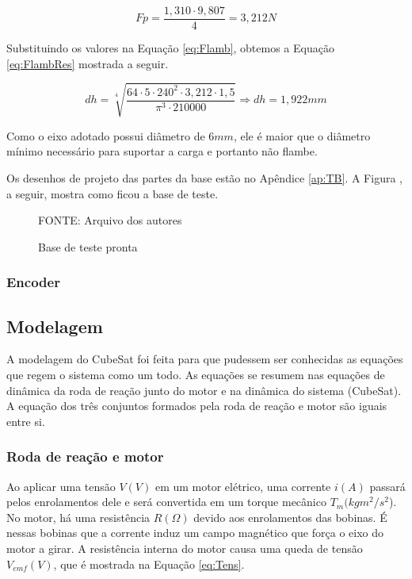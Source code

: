\documentclass[
	12pt,				%
	openany,			%
	twoside,			%
	a4paper,			%
	english,			%
	french,				%
	spanish,			%
	brazil,				%
	oldfontcommands
	]{abntex2}
\begin{document}
\begin{equation}
Fp = \frac{1,310 \cdot 9,807}{4} = 3,212 N
\label{eq:Fp}
\end{equation}

Substituindo os valores na Equação \ref{eq:Flamb}, obtemos a Equação \ref{eq:FlambRes} mostrada a seguir.

\begin{equation}
dh = \sqrt[4]{ \frac{64 \cdot 5 \cdot 240^{2} \cdot 3,212 \cdot 1,5 }{ \pi^{3} \cdot 210000 } } \Longrightarrow dh = 1,922 mm
\label{eq:FlambRes}
\end{equation}

Como o eixo adotado possui diâmetro de $6mm$, ele é maior que o diâmetro mínimo necessário para suportar a carga e portanto não flambe.

Os desenhos de projeto das partes da base estão no Apêndice \ref{ap:TB}. A Figura , a seguir, mostra como ficou a base de teste.

\begin{figure}[th]
	\caption{Base de teste pronta}
	\centering
	
	\begin{small}
		FONTE: Arquivo dos autores
	\end{small}
	\label{fig:ProtoTB}
\end{figure}

\subsubsection{Encoder}



\subsection{Modelagem}

A modelagem do CubeSat foi feita para que pudessem ser conhecidas as equações que regem o sistema como um todo. As equações se resumem nas equações de dinâmica da roda de reação junto do motor e na dinâmica do sistema (CubeSat). A equação dos três conjuntos formados pela roda de reação e motor são iguais entre si.

\subsubsection{Roda de reação e motor}

Ao aplicar uma tensão $V(V)$ em um motor elétrico, uma corrente $i(A)$ passará pelos enrolamentos dele e será convertida em um torque mecânico $T_{m}(kgm^{2}/s^{2}$). No motor, há uma resistência $R(\Omega)$ devido aos enrolamentos das bobinas. É nessas bobinas que a corrente induz um campo magnético que força o eixo do motor a girar. A resistência interna do motor causa uma queda de tensão $V_{emf}(V)$, que é mostrada na Equação \ref{eq:Tens}.
\end{document}
